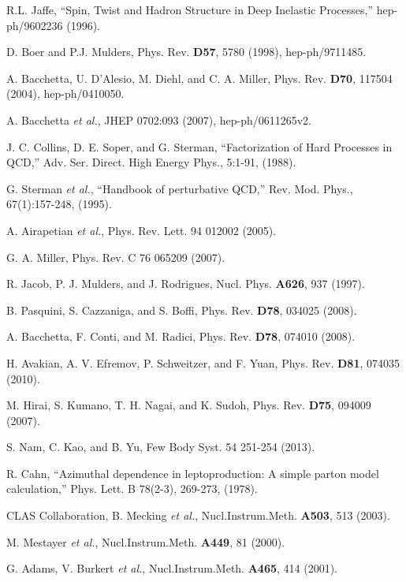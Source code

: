 \begin{thebibliography}{99}
	R.L. Jaffe, ``Spin, Twist and Hadron Structure in Deep Inelastic Processes,''
	hep-ph/9602236 (1996).

	D. Boer and P.J. Mulders, Phys. Rev. \textbf{D57},
	5780 (1998), hep-ph/9711485.

	A. Bacchetta, U. D'Alesio, M. Diehl, and C. A. Miller, Phys. Rev. \textbf{D70},
	117504 (2004), hep-ph/0410050.

	A. Bacchetta \emph{et al.}, JHEP 0702:093 (2007), hep-ph/0611265v2.

	J. C. Collins, D. E. Soper, and G. Sterman, ``Factorization of Hard Processes in QCD,''
	Adv. Ser. Direct. High Energy Phys., 5:1-91, (1988).

	G. Sterman \emph{et al.}, ``Handbook of perturbative QCD,''
	Rev. Mod. Phys., 67(1):157-248, (1995).

	A. Airapetian \emph{et al.}, Phys. Rev. Lett. 94 012002 (2005).

	G. A. Miller, Phys. Rev. C 76 065209 (2007).

	R. Jacob, P. J. Mulders, and J. Rodrigues, Nucl. Phys. \textbf{A626}, 937 (1997).

	B. Pasquini, S. Cazzaniga, and S. Boffi, Phys. Rev. \textbf{D78}, 034025 (2008).

	A. Bacchetta, F. Conti, and M. Radici, Phys. Rev. \textbf{D78}, 074010 (2008).

	H. Avakian, A. V. Efremov, P. Schweitzer, and F. Yuan, Phys. Rev. \textbf{D81}, 074035 (2010).

	M. Hirai, S. Kumano, T. H. Nagai, and K. Sudoh, Phys. Rev. \textbf{D75}, 094009 (2007).

	S. Nam, C. Kao, and B. Yu, Few Body Syst. 54 251-254 (2013).

	R. Cahn, ``Azimuthal dependence in leptoproduction: A simple parton model calculation,''
	Phys. Lett. B 78(2-3), 269-273, (1978).

	CLAS Collaboration, B. Mecking \emph{et al.}, Nucl.Instrum.Meth. \textbf{A503}, 513 (2003).

	M. Mestayer \emph{et al.}, Nucl.Instrum.Meth. \textbf{A449}, 81 (2000).

	G. Adams, V. Burkert \emph{et al.}, Nucl.Instrum.Meth. \textbf{A465}, 414 (2001).


\end{thebibliography}

